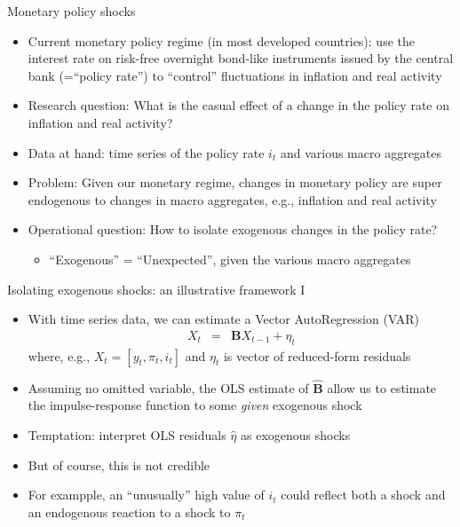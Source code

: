 \documentclass[9pt,xcolor={dvipsnames}]{beamer}
\newcommand{\bit}{\begin{itemize}}
\newcommand{\eit}{\end{itemize}}
\newcommand{\bc}{\color{blue}}
\newcommand{\lb}{\label}
\begin{document}
\begin{frame}{Monetary policy shocks}

\bit
\setlength\itemsep{1.5em} 

\item Current monetary policy regime (in most developed countries): use the interest rate on risk-free overnight bond-like instruments issued by the central bank (=``policy rate'') to ``control'' fluctuations in inflation and real activity

\item Research question: What is the casual effect of a change in the policy rate on inflation and real activity?

\item Data at hand: time series of the policy rate $i_t$ and various macro aggregates

\item Problem: Given our monetary regime, changes in monetary policy are super endogenous to changes in macro aggregates, e.g., inflation and real activity

\item Operational question: How to isolate exogenous changes in the policy rate?
\bit
	\item ``Exogenous'' = ``Unexpected'', given the various macro aggregates 
\eit

\eit

\end{frame}

\begin{frame}{Isolating exogenous shocks: an illustrative framework I}

\bit
\setlength\itemsep{1.5em} 

\item With time series data, we can estimate a {\bc Vector AutoRegression (VAR)} 
\begin{eqnarray}
\lb{reduced_form}
X_t &=& \mathbf{B} X_{t-1} + \eta_{t} \nonumber
\end{eqnarray}
where, e.g., $X_t = [y_t, \pi_t, i_t]$ and $\eta_t$ is vector of {\bc reduced-form residuals}

\item Assuming no omitted variable, the OLS estimate of $\hat{\mathbf{B}}$ allow us to estimate the impulse-response function to some \emph{given} exogenous shock

\item Temptation: interpret OLS residuals $\hat \eta$ as exogenous shocks 

\item But of course, this is not credible 

\item For exampple, an ``unusually'' high value of $i_t$ could reflect both a shock and an endogenous reaction to a shock to $\pi_t$

\eit

\end{frame}
\end{document}
